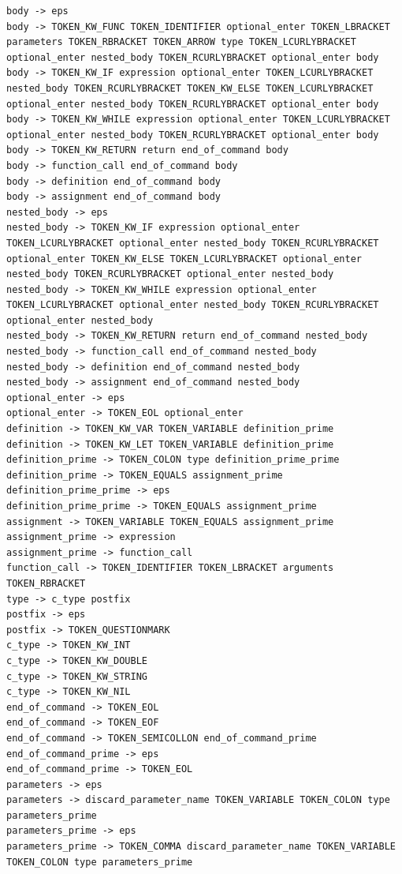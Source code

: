 \documentclass[11pt]{article}
\begin{document}
\begin{lstlisting}[style=PseudoStyle, caption=LL (1) grammar example]
body -> eps
body -> TOKEN_KW_FUNC TOKEN_IDENTIFIER optional_enter TOKEN_LBRACKET parameters TOKEN_RBRACKET TOKEN_ARROW type TOKEN_LCURLYBRACKET optional_enter nested_body TOKEN_RCURLYBRACKET optional_enter body
body -> TOKEN_KW_IF expression optional_enter TOKEN_LCURLYBRACKET nested_body TOKEN_RCURLYBRACKET TOKEN_KW_ELSE TOKEN_LCURLYBRACKET optional_enter nested_body TOKEN_RCURLYBRACKET optional_enter body
body -> TOKEN_KW_WHILE expression optional_enter TOKEN_LCURLYBRACKET optional_enter nested_body TOKEN_RCURLYBRACKET optional_enter body
body -> TOKEN_KW_RETURN return end_of_command body
body -> function_call end_of_command body
body -> definition end_of_command body
body -> assignment end_of_command body
nested_body -> eps
nested_body -> TOKEN_KW_IF expression optional_enter TOKEN_LCURLYBRACKET optional_enter nested_body TOKEN_RCURLYBRACKET optional_enter TOKEN_KW_ELSE TOKEN_LCURLYBRACKET optional_enter nested_body TOKEN_RCURLYBRACKET optional_enter nested_body
nested_body -> TOKEN_KW_WHILE expression optional_enter TOKEN_LCURLYBRACKET optional_enter nested_body TOKEN_RCURLYBRACKET optional_enter nested_body
nested_body -> TOKEN_KW_RETURN return end_of_command nested_body
nested_body -> function_call end_of_command nested_body
nested_body -> definition end_of_command nested_body
nested_body -> assignment end_of_command nested_body
optional_enter -> eps
optional_enter -> TOKEN_EOL optional_enter
definition -> TOKEN_KW_VAR TOKEN_VARIABLE definition_prime
definition -> TOKEN_KW_LET TOKEN_VARIABLE definition_prime
definition_prime -> TOKEN_COLON type definition_prime_prime
definition_prime -> TOKEN_EQUALS assignment_prime
definition_prime_prime -> eps
definition_prime_prime -> TOKEN_EQUALS assignment_prime
assignment -> TOKEN_VARIABLE TOKEN_EQUALS assignment_prime
assignment_prime -> expression
assignment_prime -> function_call
function_call -> TOKEN_IDENTIFIER TOKEN_LBRACKET arguments TOKEN_RBRACKET
type -> c_type postfix
postfix -> eps
postfix -> TOKEN_QUESTIONMARK
c_type -> TOKEN_KW_INT
c_type -> TOKEN_KW_DOUBLE
c_type -> TOKEN_KW_STRING
c_type -> TOKEN_KW_NIL
end_of_command -> TOKEN_EOL
end_of_command -> TOKEN_EOF
end_of_command -> TOKEN_SEMICOLLON end_of_command_prime
end_of_command_prime -> eps
end_of_command_prime -> TOKEN_EOL
parameters -> eps
parameters -> discard_parameter_name TOKEN_VARIABLE TOKEN_COLON type parameters_prime
parameters_prime -> eps
parameters_prime -> TOKEN_COMMA discard_parameter_name TOKEN_VARIABLE TOKEN_COLON type parameters_prime

\end{lstlisting}
\end{document}
